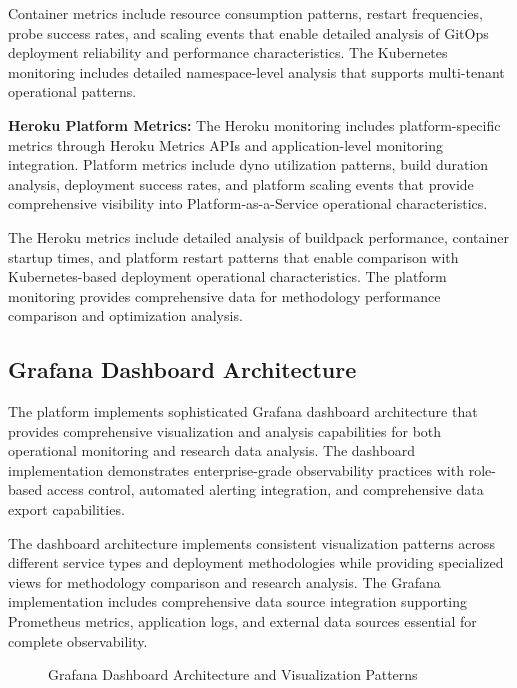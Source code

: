 Container metrics include resource consumption patterns, restart frequencies, probe success rates, and scaling events that enable detailed analysis of GitOps deployment reliability and performance characteristics. The Kubernetes monitoring includes detailed namespace-level analysis that supports multi-tenant operational patterns.

\textbf{Heroku Platform Metrics:}
The Heroku monitoring includes platform-specific metrics through Heroku Metrics APIs and application-level monitoring integration. Platform metrics include dyno utilization patterns, build duration analysis, deployment success rates, and platform scaling events that provide comprehensive visibility into Platform-as-a-Service operational characteristics.

The Heroku metrics include detailed analysis of buildpack performance, container startup times, and platform restart patterns that enable comparison with Kubernetes-based deployment operational characteristics. The platform monitoring provides comprehensive data for methodology performance comparison and optimization analysis.

\subsection{Grafana Dashboard Architecture}

The platform implements sophisticated Grafana dashboard architecture that provides comprehensive visualization and analysis capabilities for both operational monitoring and research data analysis. The dashboard implementation demonstrates enterprise-grade observability practices with role-based access control, automated alerting integration, and comprehensive data export capabilities.

The dashboard architecture implements consistent visualization patterns across different service types and deployment methodologies while providing specialized views for methodology comparison and research analysis. The Grafana implementation includes comprehensive data source integration supporting Prometheus metrics, application logs, and external data sources essential for complete observability.

\begin{figure}[H]
\centering
\caption{Grafana Dashboard Architecture and Visualization Patterns}
\label{fig:grafana-dashboard-architecture}
\end{figure}

